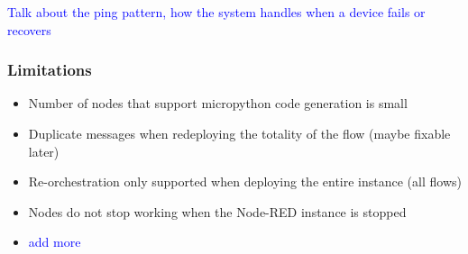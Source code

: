 \textcolor{blue}{Talk about the ping pattern, how the system handles when a device fails or recovers}

\subsubsection{Limitations}\label{sec:limitations}

\begin{itemize}
    \item Number of nodes that support micropython code generation is small
    \item Duplicate messages when redeploying the totality of the flow (maybe fixable later)
    \item Re-orchestration only supported when deploying the entire instance (all flows)
    \item Nodes do not stop working when the Node-RED instance is stopped
    \item \textcolor{blue}{add more}
\end{itemize}
